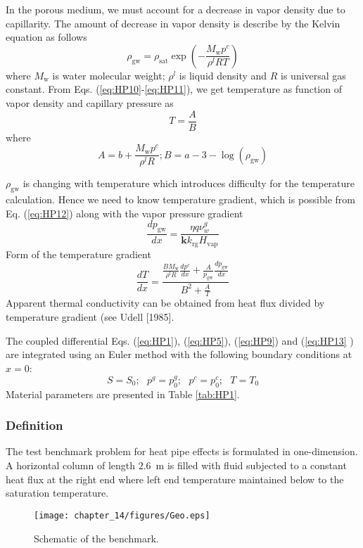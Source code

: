 In the porous medium, we must account for a decrease in vapor density due to capillarity. The amount of decrease in vapor density is describe by the Kelvin equation as follows
\begin{equation}
\rho_{\mathrm {gw}}=\rho_{\mathrm {sat}}\exp\left(-\frac{M_{\mathrm w} p^c}{\rho^l RT}\right)
\label{eq:HP11}
\end{equation}
where $M_{\mathrm w}$ is water molecular weight; $\rho^l$ is liquid density and $R$ is universal gas constant. From Eqs. (\ref{eq:HP10}-\ref{eq:HP11}), we get temperature as function of vapor density and capillary pressure as
\begin{equation}
T=\frac{A}{B}
\label{eq:HP12}
\end{equation}
where
\begin{equation*}
 A=b+\frac{M_{\mathrm w} p^c}{\rho^l R}; B=a-3 -\log\left(\rho_{\mathrm {gw}}\right)
 \label{eq:HP20}
\end{equation*}


$\rho_{\mathrm {gw}}$ is changing with temperature which introduces difficulty for the temperature calculation. Hence we need to know temperature gradient, which is possible from Eq. (\ref{eq:HP12}) along with the vapor pressure gradient 
\begin{equation}
\frac{d p_{\mathrm{gw}}}{d x} = \frac{\eta q \nu^g_w}{\mathbf k k_{\mathrm {rg}} H_{\mathrm {vap}}}
\label{eq:HP18}
\end{equation}
Form of the temperature gradient
\begin{equation}
\frac{d T}{d x}=\frac{\frac{B M_{\mathrm w}}{\rho^l R} \frac{d p^c}{d x} + \frac{A}{p_{\mathrm{gw}}} \frac{d p_{\mathrm{gw}}}{d x}}{B^2+\frac{A}{T}}
\label{eq:HP13}
\end{equation}
Apparent thermal conductivity can be obtained from heat flux divided by temperature gradient (see Udell [1985].


The coupled differential Eqs. (\ref{eq:HP1}), (\ref{eq:HP5}), (\ref{eq:HP9}) and (\ref{eq:HP13} ) are integrated using an Euler method with the following boundary conditions at $x=0$:
\begin{equation}
S=S_0;~~~ p^g=p^g_0;~~~p^c=p^c_0;~~~T=T_0
\label{eq:HP14}
\end{equation}
Material parameters are presented in Table \ref{tab:HP1}.

\subsubsection*{Definition}
The test benchmark problem for heat pipe effects is formulated in one-dimension. 
A horizontal column of length $2.6$~m is filled with fluid subjected to a constant heat flux at the right end where left end temperature maintained below to the saturation temperature.
\begin{figure}[htb]
\begin{center}
\texttt{[image: chapter\_14/figures/Geo.eps]}
\end{center}
\caption{Schematic of the benchmark.}
\label{Fig:HP1}
\end{figure}



